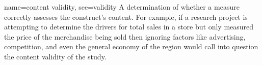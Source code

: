 







{name={content validity},
	see={validity}}
{%
	A determination of whether a measure correctly assesses the construct's content. For example, if a research project is attempting to determine the drivers for total sales in a store but only measured the price of the merchandise being sold then ignoring factors like advertising, competition, and even the general economy of the region would call into question the content validity of the study.
}


